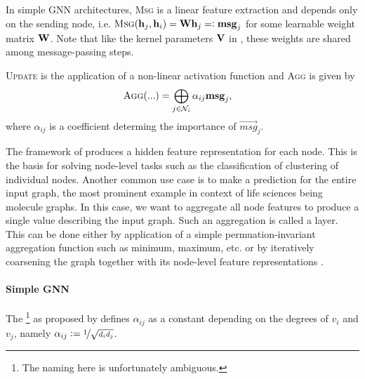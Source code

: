 \documentclass[
	fontsize=10pt, %
	twoside=false, %
	secnumdepth=1, %
  toc=indentunnumbered %
]{kaobook}
\begin{document}
In simple GNN architectures, \textsc{Msg} is a linear feature extraction and depends
only on the sending node, i.e. $\textsc{Msg}(\vec h_j, \vec h_i) = 
\mat W \vec h_j =: \msg_j$ for some learnable weight matrix $\mat W$. Note that
like the kernel parameters $\mat V$ in , these weights are
shared among message-passing steps.

\textsc{Update} is the application of a non-linear activation function and
\textsc{Agg} is given by
\begin{align*}
  & \textsc{Agg}(...) = \bigoplus_{j \in \mathcal{N}_i} \alpha_{ij} \vec{msg}_j,
\end{align*} where $\alpha_{ij}$ is a coefficient determing the importance of
$\vec{msg}_{j}$.


The framework of  produces a hidden feature
representation for each node. This is the basis for solving node-level tasks
such as the classification of clustering of individual nodes. Another common use
case is to make a prediction for the entire input graph, the most prominent
example in context of life sciences being molecule graphs. In this case, we want
to aggregate all node features to produce a single value describing the input
graph. Such an aggregation is called a  layer. This can be done
either by application of a simple permuation-invariant
aggregation function such as minimum, maximum, etc. or by iteratively coarsening
the graph together with its node-level feature representations \cite{ying_hierarchical_2019}.


\paragraph{Simple GNN} The  \footnote{The naming here is unfortunately ambiguous.} as
proposed by \citeauthor{kipf_semi-supervised_2017}
\cite{kipf_semi-supervised_2017} defines $\alpha_{ij}$ as a constant depending
on the degrees of $v_i$ and $v_j$, namely $\alpha_{ij} := \nicefrac{1}{\sqrt{d_i
    d_j}}$.
\end{document}
